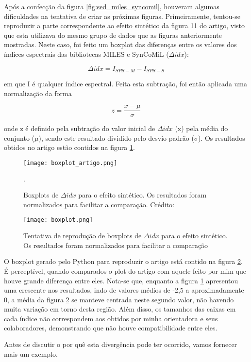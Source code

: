 \documentclass[12pt]{projeto}
\begin{document}
Após a confecção da figura \ref{fig:sed_miles_syncomil}, houveram algumas dificuldades na tentativa de criar as próximas figuras. Primeiramente, tentou-se reproduzir a parte correspondente ao efeito sintético da figura 11 do artigo, visto que esta utilizava do mesmo grupo de dados que as figuras anteriormente mostradas. Neste caso, foi feito um boxplot das diferenças entre os valores dos índices espectrais das bibliotecas MILES e SynCoMiL (\(\Delta idx\)):

\[\Delta idx = I_{SPS-M} - I_{SPS-S}\]

em que I é qualquer índice espectral. Feita esta subtração, foi então aplicada uma normalização da forma

\[z = \frac{x-\mu}{\sigma}\]

onde z é definido pela subtração do valor inicial de \(\Delta idx\) (x) pela média do conjunto (\(\mu\)), sendo este resultado dividido pelo desvio padrão (\(\sigma\)). Os resultados obtidos no artigo estão contidos na figura \ref{fig:boxplot_artigo}.


 \begin{figure}[h]
\centering
\texttt{[image: boxplot\_artigo.png]}
\caption{\label{fig:boxplot_artigo} Boxplots de \(\Delta idx\) para o efeito sintético. Os resultados foram normalizados para facilitar a comparação. Crédito: \citet{Paula2020}}.
\end{figure}

 \begin{figure}[h]
\centering
\texttt{[image: boxplot.png]}
\caption{\label{fig:boxplot} Tentativa de reprodução de boxplots de \(\Delta idx\) para o efeito sintético. Os resultados foram normalizados para facilitar a comparação}
\end{figure}

O boxplot gerado pelo Python para reproduzir o artigo está contido na figura \ref{fig:boxplot}.
É perceptível, quando comparados o plot do artigo com aquele feito por mim que houve grande diferença entre eles. Nota-se que, enquanto a figura \ref{fig:boxplot_artigo} apresentou uma crescente nos resultados, indo de valores médios de -2,5 a aproximadamente 0, a média da figura \ref{fig:boxplot} se manteve centrada neste segundo valor, não havendo muita variação em torno desta região. Além disso, os tamanhos das caixas em cada índice não correspondem aos obtidos por minha orientadora e seus colaboradores, demonstrando que não houve compatibilidade entre eles.

Antes de discutir o por quê esta divergência pode ter ocorrido, vamos fornecer mais um exemplo.
\end{document}
